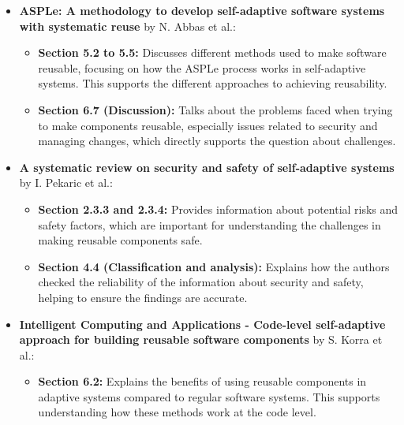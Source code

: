 \documentclass[a4paper, 12pt]{article}
\begin{document}
\begin{itemize}

\begin{itemize}
    \item \textbf{ASPLe: A methodology to develop self-adaptive software systems with systematic reuse} by N. Abbas et al.:
    \begin{itemize}
        \item \textbf{Section 5.2 to 5.5:} Discusses different methods used to make software reusable, focusing on how the ASPLe process works in self-adaptive systems. This supports the different approaches to achieving reusability.
        \item \textbf{Section 6.7 (Discussion):} Talks about the problems faced when trying to make components reusable, especially issues related to security and managing changes, which directly supports the question about challenges.
    \end{itemize}
    \item \textbf{A systematic review on security and safety of self-adaptive systems} by I. Pekaric et al.:
    \begin{itemize}
        \item \textbf{Section 2.3.3 and 2.3.4:} Provides information about potential risks and safety factors, which are important for understanding the challenges in making reusable components safe.
        \item \textbf{Section 4.4 (Classification and analysis):} Explains how the authors checked the reliability of the information about security and safety, helping to ensure the findings are accurate.
    \end{itemize}
    \item \textbf{Intelligent Computing and Applications - Code-level self-adaptive approach for building reusable software components} by S. Korra et al.:
    \begin{itemize}
        \item \textbf{Section 6.2:} Explains the benefits of using reusable components in adaptive systems compared to regular software systems. This supports understanding how these methods work at the code level.
    \end{itemize}
\end{itemize}

\end{itemize}
\end{document}
